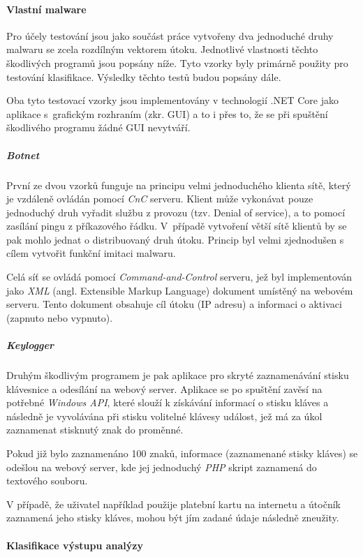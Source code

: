\paragraph*{Vlastní malware}
\label{own_malware_dp}

Pro účely testování jsou jako součást práce vytvořeny dva jednoduché druhy malwaru se zcela rozdílným vektorem útoku. Jednotlivé vlastnosti těchto škodlivých programů jsou popsány níže. Tyto vzorky byly primárně použity pro testování klasifikace. Výsledky těchto testů budou popsány dále.

Oba tyto testovací vzorky jsou implementovány v technologií .NET Core jako aplikace s~grafickým rozhraním (zkr. GUI) a to i přes to, že se při spuštění škodlivého programu žádné GUI nevytváří.

\subparagraph*{Botnet}

První ze dvou vzorků funguje na principu velmi jednoduchého klienta sítě, který je vzdáleně ovládán pomocí \emph{CnC} serveru. Klient může vykonávat pouze jednoduchý druh vyřadit službu z provozu (tzv. Denial of service), a to pomocí zasílání pingu z příkazového řádku. V~případě vytvoření větší sítě klientů by se pak mohlo jednat o distribuovaný druh útoku. Princip byl velmi zjednodušen s cílem vytvořit funkční imitaci malwaru. 

Celá síť se ovládá pomocí \emph{Command-and-Control} serveru, jež  byl implementován jako \emph{XML} (angl. Extensible Markup Language) dokument umístěný na webovém serveru. Tento dokument obsahuje cíl útoku (IP adresu) a informaci o aktivaci (zapnuto nebo vypnuto).

\subparagraph*{Keylogger}

Druhým škodlivým programem je pak aplikace pro skryté zaznamenávání stisku klávesnice a odesílání na webový server. Aplikace se po spuštění zavěsí na potřebné \emph{Windows API}, které slouží k získávání informací o stisku kláves a následně je vyvolávána při stisku volitelné klávesy událost, jež má za úkol zaznamenat stisknutý znak do proměnné. 

Pokud již bylo zaznamenáno 100 znaků, informace (zaznamenané stisky kláves) se odešlou na webový server, kde jej jednoduchý \emph{PHP} skript zaznamená do textového souboru.

V případě, že uživatel například použije platební kartu na internetu a útočník zaznamená jeho stisky kláves, mohou být jím zadané údaje následně zneužity.


\paragraph*{Klasifikace výstupu analýzy}

